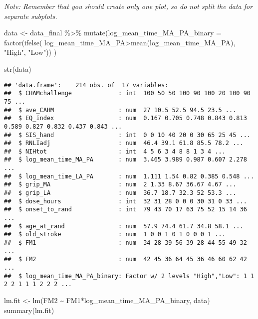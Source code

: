 \documentclass[
]{article}
\newenvironment{Shaded}{\begin{snugshade}}{\end{snugshade}}
\newcommand{\AttributeTok}[1]{\textcolor[rgb]{0.77,0.63,0.00}{#1}}
\newcommand{\FunctionTok}[1]{\textcolor[rgb]{0.00,0.00,0.00}{#1}}
\newcommand{\NormalTok}[1]{#1}
\newcommand{\OtherTok}[1]{\textcolor[rgb]{0.56,0.35,0.01}{#1}}
\newcommand{\SpecialCharTok}[1]{\textcolor[rgb]{0.00,0.00,0.00}{#1}}
\newcommand{\StringTok}[1]{\textcolor[rgb]{0.31,0.60,0.02}{#1}}
\begin{document}
\emph{Note: Remember that you should create only one plot, so do not
split the data for separate subplots.}

\begin{Shaded}
\begin{Highlighting}[]
\NormalTok{data }\OtherTok{\textless{}{-}}\NormalTok{ data\_final }\SpecialCharTok{\%\textgreater{}\%} 
  \FunctionTok{mutate}\NormalTok{(}\AttributeTok{log\_mean\_time\_MA\_PA\_binary =} \FunctionTok{factor}\NormalTok{(}\FunctionTok{ifelse}\NormalTok{(}
\NormalTok{    log\_mean\_time\_MA\_PA}\SpecialCharTok{\textgreater{}}\FunctionTok{mean}\NormalTok{(log\_mean\_time\_MA\_PA), }
    \StringTok{"High"}\NormalTok{, }\StringTok{"Low"}\NormalTok{))}
\NormalTok{    )}

\FunctionTok{str}\NormalTok{(data)}
\end{Highlighting}
\end{Shaded}

\begin{verbatim}
## 'data.frame':    214 obs. of  17 variables:
##  $ CHAMchallenge             : int  100 50 50 100 90 100 20 100 90 75 ...
##  $ ave_CAHM                  : num  27 10.5 52.5 94.5 23.5 ...
##  $ EQ_index                  : num  0.167 0.705 0.748 0.843 0.813 0.589 0.827 0.832 0.437 0.843 ...
##  $ SIS_hand                  : int  0 0 10 40 20 0 30 65 25 45 ...
##  $ RNLIadj                   : num  46.4 39.1 61.8 85.5 78.2 ...
##  $ NIHtot                    : int  4 5 6 3 4 8 8 1 3 4 ...
##  $ log_mean_time_MA_PA       : num  3.465 3.989 0.987 0.607 2.278 ...
##  $ log_mean_time_LA_PA       : num  1.111 1.54 0.82 0.385 0.548 ...
##  $ grip_MA                   : num  2 1.33 8.67 36.67 4.67 ...
##  $ grip_LA                   : num  36.7 18.7 32.3 52 53.3 ...
##  $ dose_hours                : int  32 31 28 0 0 0 30 31 0 33 ...
##  $ onset_to_rand             : int  79 43 70 17 63 75 52 15 14 36 ...
##  $ age_at_rand               : num  57.9 74.4 61.7 34.8 58.1 ...
##  $ old_stroke                : num  1 0 0 1 0 1 0 0 0 1 ...
##  $ FM1                       : num  34 28 39 56 39 28 44 55 49 32 ...
##  $ FM2                       : num  42 45 36 64 45 36 46 60 62 42 ...
##  $ log_mean_time_MA_PA_binary: Factor w/ 2 levels "High","Low": 1 1 2 2 1 1 1 2 2 2 ...
\end{verbatim}

\begin{Shaded}
\begin{Highlighting}[]
\NormalTok{lm.fit }\OtherTok{\textless{}{-}} \FunctionTok{lm}\NormalTok{(FM2 }\SpecialCharTok{\textasciitilde{}}\NormalTok{ FM1}\SpecialCharTok{*}\NormalTok{log\_mean\_time\_MA\_PA\_binary, data)}
\FunctionTok{summary}\NormalTok{(lm.fit)}
\end{Highlighting}
\end{Shaded}
\end{document}
